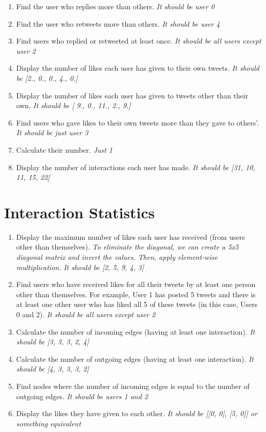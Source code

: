 \documentclass[11pt, a4paper]{article}
\newcommand{\cmt}[1]{\textit{\color{red}#1}}
\begin{document}
\begin{enumerate}
	\item Find the user who replies more than others. \cmt{It should be user 0}
	\item Find the user who retweets more than others. \cmt{It should be user 4}
	\item Find users who replied or retweeted at least once. \cmt{It should be all users except user 2}
	\item Display the number of likes each user has given to their own tweets. \cmt{It should be [2., 0., 0., 4., 0.]}
	\item Display the number of likes each user has given to tweets other than their own.
	\cmt{It should be [ 9.,  0., 11.,  2.,  9.]}
	\item Find users who gave likes to their own tweets more than they gave to others'.
	\cmt{It should be just user 3}
	\item Calculate their number. \cmt{Just 1}
	\item Display the number of interactions each user has made. \cmt{It should be [31, 10, 11, 15, 22]}
\end{enumerate}

\newpage
\section*{Interaction Statistics}

\begin{enumerate}
	\item Display the maximum number of likes each user has received (from users other than themselves).
	\textit{To eliminate the diagonal, we can create a 5x5 diagonal matrix and invert the values. Then, apply element-wise multiplication.}
	\cmt{It should be [2, 5, 9, 4, 3]}
	
	\item Find users who have received likes for all their tweets by at least one person other than themselves.
	For example, User 1 has posted 5 tweets and there is at least one other user who has liked all 5 of these tweets (in this case, Users 0 and 2).
	\cmt{It should be all users except user 2}
	
	\item Calculate the number of incoming edges (having at least one interaction).
	\cmt{It should be [3, 3, 3, 2, 4]}
	\item Calculate the number of outgoing edges (having at least one interaction).
	\cmt{It should be [4, 3, 3, 3, 2]}
	\item Find nodes where the number of incoming edges is equal to the number of outgoing edges.
	\cmt{It should be users 1 and 2}
	\item Display the likes they have given to each other.
	\cmt{It should be [[0, 0], [5, 0]] or something equivalent}
\end{enumerate}
\end{document}
